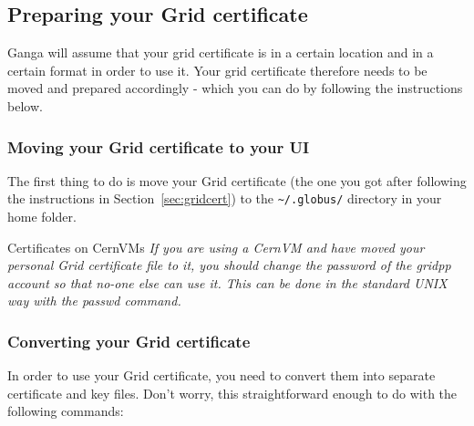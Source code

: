 \subsection{Preparing your Grid certificate}
\label{sec:certprep}
Ganga will assume that your grid certificate is in a certain location
and in a certain format in order to use it. Your grid certificate
therefore needs to be moved and prepared accordingly - which you can do
by following the instructions below.

\subsubsection{Moving your Grid certificate to your UI}
\label{moving-your-grid-certificate-to-your-ui}
The first thing to do is move your Grid certificate (the one you got
after following the instructions in Section~\ref{sec:gridcert})
to the \texttt{\textasciitilde{}/.globus/} directory in your home folder.

\begin{Shaded}
\begin{Highlighting}[]
\NormalTok{$ } \NormalTok{~}
\NormalTok{$ }
\NormalTok{[} \NormalTok{home directory.]}
\NormalTok{$ } 
\NormalTok{$ } 
\end{Highlighting}
\end{Shaded}

\begin{warningbox}{Certificates on CernVMs}
\emph{If you are using a CernVM and have moved your personal Grid certificate
file to it, you should change the password of the gridpp account so that
no-one else can use it. This can be done in the standard UNIX way with
the passwd command.}
\end{warningbox}

\subsubsection{Converting your Grid certificate}
\label{converting-your-grid-certificate}
In order to use your Grid certificate, you need to convert them into
separate certificate and key files. Don't worry, this straightforward
enough to do with the following commands:

